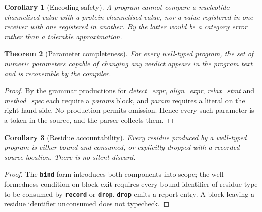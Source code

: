 \documentclass[11pt,twocolumn,a4paper]{article}
\theoremstyle{plain}
\newtheorem{theorem}{Theorem}[section]
\newtheorem{corollary}[theorem]{Corollary}
\theoremstyle{definition}
\theoremstyle{remark}
\newcommand{\kw}[1]{\texttt{\textbf{#1}}}
\begin{document}
\begin{corollary}[Encoding safety]
A program cannot compare a nucleotide-channelised value with a
protein-channelised value, nor a value registered in one receiver with
one registered in another. By  the latter would be a
category error rather than a tolerable approximation.
\end{corollary}

\begin{theorem}[Parameter completeness]
\label{thm:params}
For every well-typed program, the set of numeric parameters capable of
changing any verdict appears in the program text and is recoverable by
the compiler.
\end{theorem}
\begin{proof}
By  the grammar productions for
\textit{detect\_expr}, \textit{align\_expr}, \textit{relax\_stmt} and
\textit{method\_spec} each require a \textit{params} block, and
\textit{param} requires a literal on the right-hand side. No production
permits omission. Hence every such parameter is a token in the source,
and the parser collects them.
\end{proof}

\begin{corollary}[Residue accountability]
\label{cor:resacc}
Every residue produced by a well-typed program is either bound and
consumed, or explicitly dropped with a recorded source location. There
is no silent discard.
\end{corollary}
\begin{proof}
The \kw{bind} form introduces both components into scope; the
well-formedness condition on block exit requires every bound identifier
of residue type to be consumed by \kw{record} or \kw{drop}. \kw{drop}
emits a report entry. A block leaving a residue identifier unconsumed
does not typecheck.
\end{proof}
\end{document}
